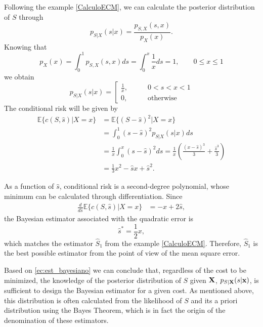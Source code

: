 \begin{example}
\label{CalculoECM2}
Following the example \ref{CalculoECM}, we can calculate the posterior distribution of $S$ through
\begin{equation}
p_{S|X}(s|x) = \frac{p_{S,X}(s,x)}{p_X(x)}. 
\end{equation}
Knowing that
\begin{equation}
p_{X}(x) = \int_0^1 p_{S,X}(s,x) ds = \int_0^x \frac{1}{x} ds = 1,   \qquad 0\le x\le 1
\end{equation}
we obtain
\begin{equation}
p_{S|X}(s|x) = \left[
\begin{array}{ll}
\frac{1}{x}, & \qquad 0<s<x<1 \\
0,           & \qquad \text{otherwise}
\end{array}
\right.
\end{equation}
The conditional risk will be given by
\begin{align}
\mathbb{E}\{c(S,\hat s)|X=x\} 
   &= \mathbb{E}\{(S-\hat s)^2|X=x\} \nonumber\\
   &= \int_0^1 (s-\hat{s})^2 p_{S|X}(s|x) ds   \nonumber\\
   &= \frac{1}{x} \int_0^x (s-\hat{s})^2 ds  
    = \frac{1}{x} \left(\frac{(x-\hat{s})^3}{3} + \frac{\hat{s}^3}{3} \right)    \nonumber\\
   &= \frac{1}{3}x^2 - \hat{s} x + \hat{s}^2. 
\label{Est:ECMsx}
\end{align}

As a function of $\hat{s}$, conditional risk is a second-degree polynomial, whose minimum can be calculated through differentiation. Since
\begin{align}
\frac{d}{d\hat{s}} \mathbb{E}\{c(S,\hat s)|X=x\} 
   &= - x + 2 \hat{s} ,
\end{align}
the Bayesian estimator associated with the quadratic error is
\begin{equation}
\label{eq:sopt_halfx}
\hat{s}^* = \frac{1}{2}x,
\end{equation}
which matches the estimator $\hat{S}_1$ from the example \ref{CalculoECM}. Therefore, $\hat{S}_1$ is the best possible estimator from the point of view of the mean square error.
\end{example}\vspace{0.4cm}

Based on \eqref{ec:est_bayesiano} we can conclude that, regardless of the cost to be minimized, the knowledge of the posterior distribution of $S$ given ${\bf X}$, $p_{S|{\bf X}}(s|{\bf x})$, is sufficient to design the Bayesian estimator for a given cost. As mentioned above, this distribution is often calculated from the likelihood of $S$ and its a priori distribution using the Bayes Theorem, which is in fact the origin of the denomination of these estimators.

